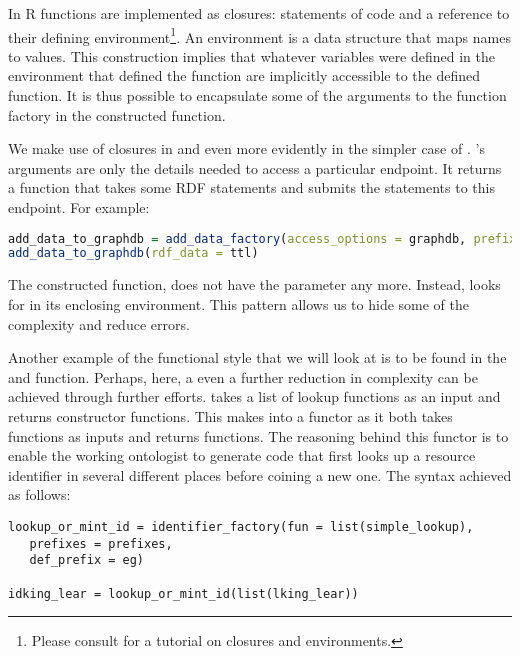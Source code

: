 In R functions are implemented as closures: statements of code and a reference to their defining environment\footnote{Please consult \cite{wickham_advanced_2015} for a tutorial on closures and environments.}. An environment is a data structure that maps names to values. This construction implies that whatever variables were defined in the environment that defined the function are implicitly accessible to the defined function. It is thus possible to encapsulate some of the arguments to the function factory in the constructed function.

We make use of closures in  and even more evidently in the simpler case of . 's arguments are only the details needed to access a particular endpoint. It returns a function that takes some RDF statements and submits the statements to this endpoint. For example:

\begin{lstlisting}[language=R,
style=customr]
add_data_to_graphdb = add_data_factory(access_options = graphdb, prefixes = prefixes)
add_data_to_graphdb(rdf_data = ttl)
\end{lstlisting}

The constructed function,  does not have the parameter  any more. Instead,  looks for  in its enclosing environment. This pattern allows us to hide some of the complexity and reduce errors.

Another example of the functional style that we will look at is to be found in the  and  function. Perhaps, here, a even a further reduction in complexity can be achieved through further efforts.  takes a list of lookup functions as an input and returns constructor functions. This makes  into a functor as it both takes functions as inputs and returns functions. The reasoning behind this functor is to enable the working ontologist to generate code that first looks up a resource identifier in several different places before coining a new one. The syntax achieved as follows:

\begin{lstlisting}[style=customr]
lookup_or_mint_id = identifier_factory(fun = list(simple_lookup),
   prefixes = prefixes,
   def_prefix = eg)

idking_lear = lookup_or_mint_id(list(lking_lear))
\end{lstlisting}

